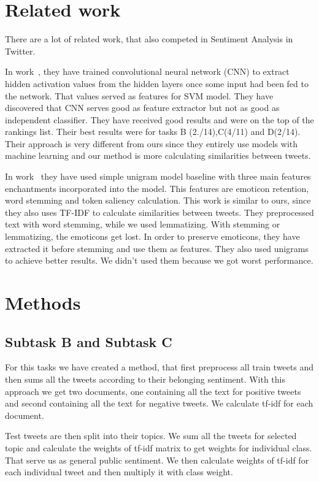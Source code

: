 \documentclass[runningheads,a4paper]{llncs}
\begin{document}
\section{Related work}
There are a lot of related work, that also competed in Sentiment Analysis in Twitter.

 In work~\cite{vilaresa2016lys}, they have trained convolutional neural network (CNN) to extract hidden activation values from the hidden layers once some input had been fed to the network. That values served as features for SVM model. They have discovered that CNN serves good as feature extractor but not as good as independent classifier. They have received good results and were on the top of the rankings list. Their best results were for tasks B (2./14),C(4/11) and D(2/14). Their approach is very different from ours since they entirely use models with machine learning and our method is more calculating similarities between tweets. 

In work~\cite{briones2016vcu} they have used simple unigram model baseline with three main features enchantments incorporated into the model. This features are emoticon retention, word stemming and token saliency calculation. This work is similar to ours, since they also uses TF-IDF to calculate similarities between tweets. They preprocessed text with word stemming, while we used lemmatizing. With stemming or lemmatizing, the emoticons get lost. In order to preserve emoticons, they have extracted it before stemming and use them as features. They also used unigrams to achieve better results. We didn't used them because we got worst performance.


\section{Methods}

\subsection{Subtask B and Subtask C}
For this tasks we have created a method, that first preprocess all train tweets and then sums all the tweets according to their belonging sentiment. With this approach we get two documents, one containing all the text for positive tweets and second containing all the text for negative tweets. We calculate tf-idf for each document. 

Test tweets are then split into their topics. We sum all the tweets for selected topic and calculate the weights of tf-idf matrix to get weights for individual class. That serve us as general public sentiment. We then calculate weights of tf-idf for each individual tweet and then multiply it with class weight. 
\end{document}
